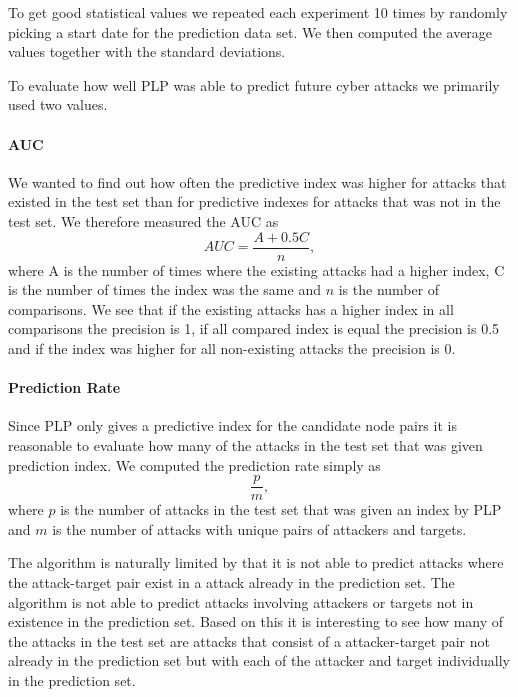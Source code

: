 To get good statistical values we repeated each experiment 10 times by randomly picking a start date for the prediction data set. We then computed the average values together with the standard deviations.

To evaluate how well PLP was able to predict future cyber attacks we primarily used two values. 
\paragraph{AUC}\label{plp:auc}
We wanted to find out how often the predictive index was higher for attacks that existed in the test set than for predictive indexes for attacks that was not in the test set. We therefore measured the AUC as
$$
  AUC = \frac{A+0.5C}{n},
$$
where A is the number of times where the existing attacks had a higher index, C is the number of times the index was the same and $n$ is the number of comparisons. We see that if the existing attacks has a higher index in all comparisons the precision is 1, if all compared index is equal the precision is 0.5 and if the index was higher for all non-existing attacks the precision is 0.

\paragraph{Prediction Rate}\label{plp:predict_rate}
Since PLP only gives a predictive index for the candidate node pairs it is reasonable to evaluate how many of the attacks in the test set that was given prediction index. We computed the prediction rate simply as
$$
  \frac{p}{m},
$$
where $p$ is the number of attacks in the test set that was given an index by PLP and $m$ is the number of attacks with unique pairs of attackers and targets.

The algorithm is naturally limited by that it is not able to predict attacks where the attack-target pair exist in a attack already in the prediction set. The algorithm is not able to predict attacks involving attackers or targets not in existence in the prediction set. Based on this it is interesting to see how many of the attacks in the test set are attacks that consist of a attacker-target pair not already in the prediction set but with each of the attacker and target individually in the prediction set.
